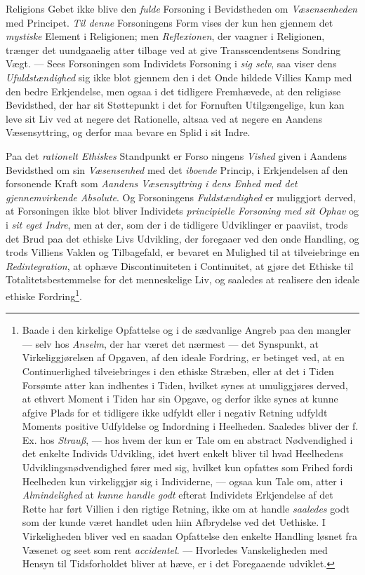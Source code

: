 Religions Gebet ikke blive den \emph{fulde} Forsoning i Bevidstheden om
\emph{Væsensenheden} med Principet. \emph{Til denne} Forsoningens Form vises der
kun hen gjennem det \emph{mystiske} Element i Religionen; men
\emph{Reflexionen}, der vaagner i Religionen, trænger det uundgaaelig atter
tilbage ved at give Transscendentsens Sondring Vægt. --- Sees Forsoningen som
Individets Forsoning i \emph{sig selv}, saa viser dens
\emph{Ufuldstændighed} sig ikke blot gjennem den i det Onde hildede Villies Kamp
med den bedre Erkjendelse, men ogsaa i det tidligere Fremhævede, at den
religiøse Bevidsthed, der har sit Støttepunkt i det for Fornuften
Utilgængelige, kun kan leve sit Liv ved at negere det Rationelle, altsaa ved at
negere en Aandens Væsensyttring, og derfor maa bevare en Splid i sit Indre.

Paa det \emph{rationelt Ethiskes} Standpunkt er Forso\-%
\setcounter{footnote}{0}%
ningens \emph{Vished} given i Aandens Bevidsthed om sin \emph{Væsensenhed} med
det \emph{iboende} Princip, i Erkjendelsen af den forsonende Kraft som
\emph{Aandens Væsensyttring i dens Enhed med det gjennemvirkende Absolute}. Og
Forsoningens \emph{Fuldstændighed} er muliggjort derved, at Forsoningen ikke
blot bliver Individets \emph{principielle Forsoning med sit Ophav} og i
\emph{sit eget Indre}, men at der, som der i de tidligere Udviklinger er
paaviist, trods det Brud paa det ethiske Livs Udvikling, der foregaaer ved den
onde Handling, og trods Villiens Vaklen og Tilbagefald, er bevaret en Mulighed
til at tilveiebringe en \emph{Redintegration}, at ophæve Discontinuiteten i
Continuitet, at gjøre det Ethiske til Totalitetsbestemmelse for det menneskelige
Liv, og saaledes at realisere den ideale ethiske Fordring\footnote{Baade i den
kirkelige Opfattelse og i de sædvanlige Angreb paa den mangler --- selv hos
\emph{Anselm}, der har været det nærmest --- det Synspunkt, at
Virkeliggjørelsen af Opgaven, af den ideale Fordring, er betinget ved, at en
Continuerlighed tilveiebringes i den ethiske Stræben, eller at det i Tiden
Forsømte atter kan indhentes i Tiden, hvilket synes at umuliggjøres derved, at
ethvert Moment i Tiden har sin Opgave, og derfor ikke synes at kunne afgive
Plads for et tidligere ikke udfyldt eller i negativ Retning udfyldt Moments
positive Udfyldelse og Indordning i Heelheden. Saaledes bliver der f. Ex. hos
\emph{Strauß}, --- hos hvem der kun er Tale om en abstract Nødvendighed i det
enkelte Individs Udvikling, idet hvert enkelt bliver til hvad Heelhedens
Udviklingsnødvendighed fører med sig, hvilket kun opfattes som Frihed fordi
Heelheden kun virkeliggjør sig i Individerne, --- ogsaa kun Tale om, atter i
\emph{Almindelighed} at \emph{kunne handle godt} efterat Individets Erkjendelse
af det Rette har ført Villien i den rigtige Retning, ikke om at handle
\emph{saaledes} godt som der kunde været handlet uden hiin Afbrydelse ved det
Uethiske. I Virkeligheden bliver ved en saadan Opfattelse den enkelte Handling
løsnet fra Væsenet og seet som rent \emph{accidentel}. --- Hvorledes
Vanskeligheden med Hensyn til Tidsforholdet bliver at hæve, er i det
Foregaaende udviklet.}.

